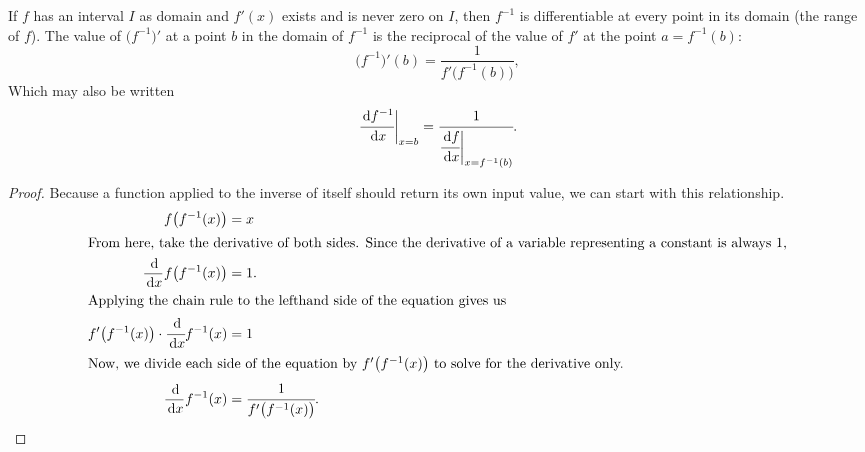 \begin{theorem}\label{th:invderiv}
  If $f$ has an interval $I$ as domain and $f'(x)$ exists and is never zero on $I$, then $f^{-1}$ is differentiable at every point in its domain (the range of $f$). The value of $\big(f^{-1}\big)'$ at a point $b$ in the domain of $f^{-1}$ is the reciprocal of the value of $f'$ at the point $a=f^{-1}(b)$:
  \begin{equation}
    \big(f^{-1}\big)'(b)=\frac{1}{f'\big(f^{-1}(b)\big)},
  \end{equation}
  Which may also be written
  \begin{equation}
    \cfrac{\,\mathrm{d} f^{-1}}{\,\mathrm{d} x}\bigg|_{x=b}=\cfrac{1}{\cfrac{\,\mathrm{d} f}{\,\mathrm{d} x}\bigg|_{x=f^{-1}(b)}}.
  \end{equation}
  \begin{proof}
  Because a function applied to the inverse of itself should return its own input value, we can start with this relationship.
    \begin{align*}
      f \big( f^{-1}(x) \big) &= x \\
      \intertext{From here, take the derivative of both sides. Since the derivative of a variable representing a constant is always 1,}
      \frac{\,\mathrm{d}}{\,\mathrm{d} x} f\big(f^{-1}(x)\big) &= 1. \\
      \intertext{Applying the chain rule to the lefthand side of the equation gives us}
      f'\big(f^{-1}(x)\big)\cdot \cfrac{\,\mathrm{d}}{\,\mathrm{d} x}f^{-1}(x) &= 1  \\
      \intertext{Now, we divide each side of the equation by $f' \big( f^{-1}(x) \big)$ to solve for the derivative only.}
      \frac{\,\mathrm{d}}{\,\mathrm{d} x}f^{-1}(x) &= \cfrac{1}{f'\big(f^{-1}(x)\big)}.\qedhere
    \end{align*}
  \end{proof}
\end{theorem}

